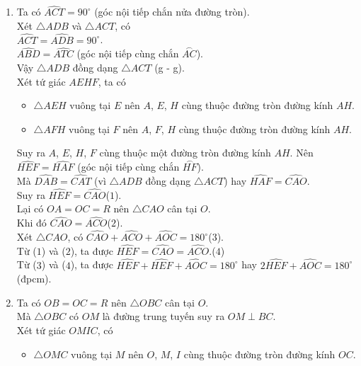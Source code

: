 \begin{bt}[3,0 điểm]
{\begin{enumerate}
\begin{itemize}
			\end{itemize}
			Suy ra $B$, $C$, $E$, $F$ cùng thuộc đường tròn đường kính $BC$.\\
			Vậy tứ giác $BEFC$ nội tiếp đường tròn.
			\item Ta có $\widehat{ACT}=90^{\circ}$ (góc nội tiếp chắn nửa đường tròn).\\
			Xét $\triangle ADB$ và $\triangle ACT$, có\\
			$\widehat{ACT}=\widehat{ADB}=90^{\circ}$.\\
			$\widehat{ABD}=\widehat{ATC}$ (góc nội tiếp cùng chắn $\stackrel\frown{AC}$).\\
			Vậy $\triangle ADB$ đồng dạng $\triangle ACT$ (g - g).\\
			Xét tứ giác $AEHF$, ta có
			\begin{itemize}
				\item $\triangle AEH$ vuông tại $E$ nên $A$, $E$, $H$ cùng thuộc đường tròn đường kính $AH$.
				\item $\triangle AFH$ vuông tại $F$ nên $A$, $F$, $H$ cùng thuộc đường tròn đường kính $AH$.
			\end{itemize}
			Suy ra $A$, $E$, $H$, $F$ cùng thuộc một đường tròn đường kính $AH$.
			Nên $\widehat{HEF}=\widehat{HAF}$ (góc nội tiếp cùng chắn $\stackrel\frown{HF}$).\\
			Mà $\widehat{DAB}=\widehat{CAT}$ (vì $\triangle ADB$ đồng dạng $\triangle ACT$) hay $\widehat{HAF}=\widehat{CAO}$.\\
			Suy ra $\widehat{HEF}=\widehat{CAO}$\quad ($1$).\\
			Lại có $OA=OC=R$ nên $\triangle CAO$ cân tại $O$.\\
			Khi đó $\widehat{CAO}=\widehat{ACO}$\quad ($2$).\\
			Xét $\triangle CAO$, có $\widehat{CAO}+\widehat{ACO}+\widehat{AOC}=180^{\circ}$\quad ($3$).\\
			Từ ($1$) và ($2$), ta được $\widehat{HEF}=\widehat{CAO}=\widehat{ACO}$.\quad ($4$)\\
			 Từ ($3$) và ($4$), ta được $\widehat{HEF}+\widehat{HEF}+\widehat{AOC}=180^{\circ}$ hay $2\widehat{HEF}+\widehat{AOC}=180^{\circ}$ (đpcm).
			\item Ta có $OB=OC=R$ nên $\triangle OBC$ cân tại $O$.\\
			Mà $\triangle OBC$ có $OM$ là đường trung tuyến suy ra $OM\perp BC$.\\
			Xét tứ giác $OMIC$, có
			\begin{itemize}
				\item $\triangle OMC$ vuông tại $M$ nên $O$, $M$, $I$ cùng thuộc đường tròn đường kính $OC$.

\end{itemize}
\end{enumerate}}
\end{bt}
